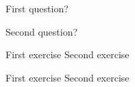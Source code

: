 \begin{activity}
\begin{ctqs}

	\question First question?
		\begin{solution}[1in]
		\end{solution}
	
	\question Second question?
		\begin{solution}[1in]
		\end{solution}
\end{ctqs}



\begin{exercises}

	\exercise First exercise
	\exercise Second exercise
	
\end{exercises}


\begin{problems}

	\problem First exercise
	\problem Second exercise
	
\end{problems}


	
\end{activity}